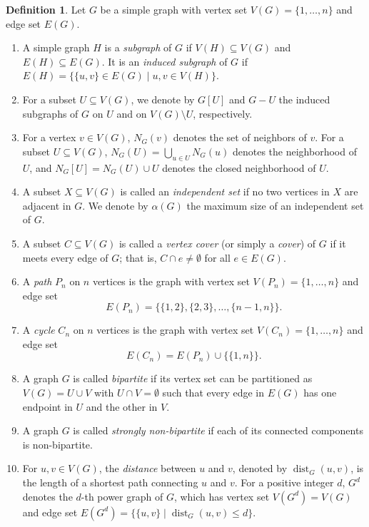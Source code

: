 \documentclass[12pt,reqno,twoside]{amsart}
\theoremstyle{definition}
\newtheorem{defn}[thm]{\bf Definition}
\theoremstyle{plain}
\theoremstyle{remark}
\numberwithin{equation}{section}
\begin{document}
\begin{defn}
Let $G$ be a simple graph with vertex set $V(G) = \{1, \ldots, n\}$ and edge set $E(G)$.
\begin{enumerate}
    \item A simple graph $H$ is a \emph{subgraph} of $G$ if $V(H) \subseteq V(G)$ and $E(H) \subseteq E(G)$. It is an \emph{induced subgraph} of $G$ if $E(H) = \{\{u,v\} \in E(G) \mid u, v \in V(H)\}$.
    
    \item For a subset $U \subseteq V(G)$, we denote by $G[U]$ and $G - U$ the induced subgraphs of $G$ on $U$ and on $V(G) \setminus U$, respectively.
    
    \item For a vertex $v \in V(G)$, $N_G(v)$ denotes the set of neighbors of $v$. For a subset $U \subseteq V(G)$, $N_G(U) = \bigcup_{u \in U} N_G(u)$ denotes the neighborhood of $U$, and $N_G[U] = N_G(U) \cup U$ denotes the closed neighborhood of $U$.

   \item A subset $X \subseteq V(G)$ is called an \emph{independent set} if no two vertices in $X$ are adjacent in $G$. We denote by $\alpha(G)$ the maximum size of an independent set of $G$.
   
    \item A subset $C \subseteq V(G)$ is called a \emph{vertex cover} (or simply a \emph{cover}) of $G$ if it meets every edge of $G$; that is, $C \cap e \neq \emptyset$ for all $e \in E(G)$.

    \item A \emph{path} $P_n$ on $n$ vertices is the graph with vertex set $V(P_n) = \{1, \ldots, n\}$ and edge set
    \[
    E(P_n) = \{\{1,2\}, \{2,3\}, \ldots, \{n-1,n\}\}.
    \]
    
    \item A \emph{cycle} $C_n$ on $n$ vertices is the graph with vertex set $V(C_n) = \{1, \ldots, n\}$ and edge set
    \[
    E(C_n) = E(P_n) \cup \{\{1,n\}\}.
    \]
    \item A graph $G$ is called \emph{bipartite} if its vertex set can be partitioned as $V(G) = U \cup V$ with $U \cap V = \emptyset$ such that every edge in $E(G)$ has one endpoint in $U$ and the other in $V$.

\item A graph $G$ is called \emph{strongly non-bipartite} if each of its connected components is non-bipartite.
    
\item For $u,v \in V(G)$, the \emph{distance} between $u$ and $v$, denoted by $\operatorname{dist}_G(u,v)$, is the length of a shortest path connecting $u$ and $v$. For a positive integer $d$, $G^d$ denotes the $d$-th power graph of $G$, which has vertex set $V(G^d) = V(G)$ and edge set $E(G^d) = \{\{u,v\} \mid \operatorname{dist}_G(u,v) \le d\}$.


\end{enumerate}
\end{defn}
\end{document}
